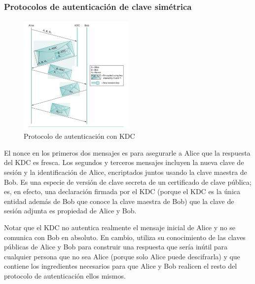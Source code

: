 \subsubsection*{Protocolos de autenticación de clave simétrica}
\begin{figure}[H]
	\centering
	\includegraphics[width=0.5\textwidth]{images/kcd-autenthication.png}
	\caption[Protocolo de autenticación con KDC]{Protocolo de autenticación con KDC}
	\label{fig:kcd-authentication}
\end{figure}
El nonce en los primeros dos mensajes es para asegurarle a Alice que la respuesta del KDC es fresca. Los segundos y terceros mensajes incluyen la nueva clave de sesión y la identificación de Alice, encriptados juntos usando la clave maestra de Bob. Es una especie de versión de clave secreta de un certificado de clave pública; es, en efecto, una declaración firmada por el KDC (porque el KDC es la única entidad además de Bob que conoce la clave maestra de Bob) que la clave de sesión adjunta es propiedad de Alice y Bob.

Notar que el KDC no autentica realmente el mensaje inicial de Alice y no se comunica con Bob en absoluto. En cambio, utiliza su conocimiento de las claves públicas de Alice y Bob para construir una respuesta que sería inútil para cualquier persona que no sea Alice (porque solo Alice puede descifrarla) y que contiene los ingredientes necesarios para que Alice y Bob realicen el resto del protocolo de autenticación ellos mismos.
